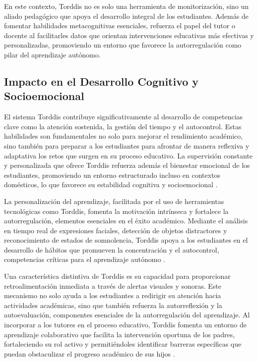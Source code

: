 \documentclass[a4paper,fleqn]{cas-sc}
\begin{document}
			En este contexto, Torddis no es solo una herramienta de monitorización, sino un aliado pedagógico que apoya el desarrollo integral de los estudiantes. Además de fomentar habilidades metacognitivas esenciales, refuerza el papel del tutor o docente al facilitarles datos que orientan intervenciones educativas más efectivas y personalizadas, promoviendo un entorno que favorece la autorregulación como pilar del aprendizaje autónomo.
			
		\subsection{Impacto en el Desarrollo Cognitivo y Socioemocional}
			El sistema Torddis contribuye significativamente al desarrollo de competencias clave como la atención sostenida, la gestión del tiempo y el autocontrol. Estas habilidades son fundamentales no solo para mejorar el rendimiento académico, sino también para preparar a los estudiantes para afrontar de manera reflexiva y adaptativa los retos que surgen en su proceso educativo. La supervisión constante y personalizada que ofrece Torddis refuerza además el bienestar emocional de los estudiantes, promoviendo un entorno estructurado incluso en contextos domésticos, lo que favorece su estabilidad cognitiva y socioemocional \citep{SaezLopez2016Visual,Mohamed2018Implementing,Navarro2024}.
			
			La personalización del aprendizaje, facilitada por el uso de herramientas tecnológicas como Torddis, fomenta la motivación intrínseca y fortalece la autorregulación, elementos esenciales en el éxito académico. Mediante el análisis en tiempo real de expresiones faciales, detección de objetos distractores y reconocimiento de estados de somnolencia, Torddis apoya a los estudiantes en el desarrollo de hábitos que promueven la concentración y el autocontrol, competencias críticas para el aprendizaje autónomo \citep{Ackermans2025Young}.
			
			Una característica distintiva de Torddis es su capacidad para proporcionar retroalimentación inmediata a través de alertas visuales y sonoras. Este mecanismo no solo ayuda a los estudiantes a redirigir su atención hacia actividades académicas, sino que también refuerza la autorreflexión y la autoevaluación, componentes esenciales de la autorregulación del aprendizaje. Al incorporar a los tutores en el proceso educativo, Torddis fomenta un entorno de aprendizaje colaborativo que facilita la intervención oportuna de los padres, fortaleciendo su rol activo y permitiéndoles identificar barreras específicas que puedan obstaculizar el progreso académico de sus hijos \citep{Li2024Systematic}.
		
\end{document}
